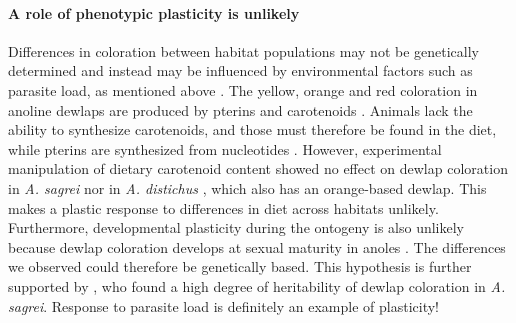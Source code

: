 \paragraph{A role of phenotypic plasticity is unlikely} Differences in coloration between habitat populations may not be genetically determined and instead may be influenced by environmental factors such as parasite load, as mentioned above \citep{Cook2013}. The yellow, orange and red coloration in anoline dewlaps are produced by pterins and carotenoids \citep{Ortiz1962, Ortiz1962a, Ortiz1963, Ortiz1966, Macedonia2000, Steffen2007, Steffen2009}. Animals lack the ability to synthesize carotenoids, and those must therefore be found in the diet, while pterins are synthesized from nucleotides \citep{Goodwin1984, Hill2002, Hill2006}. However, experimental manipulation of dietary carotenoid content showed no effect on dewlap coloration in \textit{A. sagrei} \citep{Steffen2010} nor in \textit{A. distichus} \citep{Ng2013}, which also has an orange-based dewlap. This makes a plastic response to differences in diet across habitats unlikely. Furthermore, developmental plasticity during the ontogeny is also unlikely because dewlap coloration develops at sexual maturity in anoles \citep{Ng2013}. The differences we observed could therefore be genetically based. This hypothesis is further supported by \citet{Cox2017}, who found a high degree of heritability of dewlap coloration in \textit{A. sagrei}. Response to parasite load is definitely an example of plasticity!\\ %






